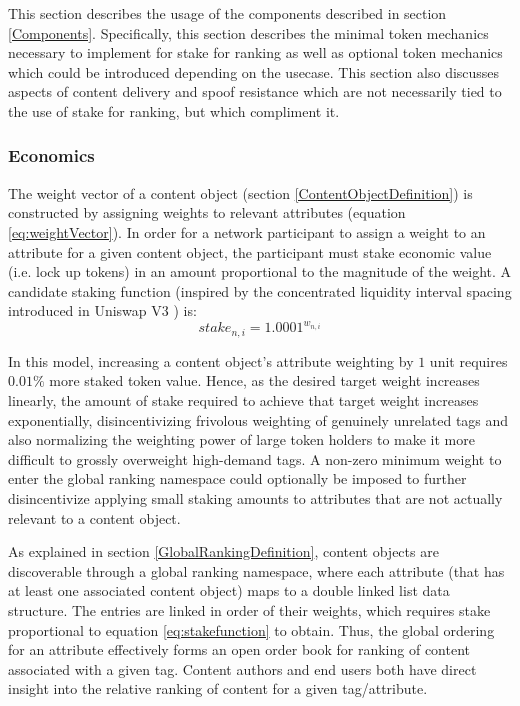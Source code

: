 This section describes the usage of the components described in section \ref{Components}. Specifically, this section describes the minimal token mechanics necessary to implement for stake for ranking as well as optional token mechanics which could be introduced depending on the usecase. This section also discusses aspects of content delivery and spoof resistance which are not necessarily tied to the use of stake for ranking, but which compliment it. 

\subsubsection{Economics}
The weight vector of a content object (section \ref{ContentObjectDefinition}) is constructed by assigning weights to relevant attributes (equation \ref{eq:weightVector}). In order for a network participant to assign a weight to an attribute for a given content object, the participant must stake economic value (i.e. lock up tokens) in an amount proportional to the magnitude of the weight. A candidate staking function (inspired by the concentrated liquidity interval spacing introduced in Uniswap V3 \cite{adams2021uniswap}) is: 
\begin{equation}
\label{eq:stakefunction}
    stake_{n,i} = 1.0001^{w_{n,i}}
\end{equation}

In this model, increasing a content object's attribute weighting by $1$ unit requires $0.01\%$ more staked token value. Hence, as the desired target weight increases linearly, the amount of stake required to achieve that target weight increases exponentially, disincentivizing frivolous weighting of genuinely unrelated tags and also normalizing the weighting power of large token holders to make it more difficult to grossly overweight high-demand tags. 
A non-zero minimum weight to enter the global ranking namespace could optionally be imposed to further disincentivize applying small staking amounts to attributes that are not actually relevant to a content object.

As explained in section \ref{GlobalRankingDefinition}, content objects are discoverable through a global ranking namespace, where each attribute (that has at least one associated content object) maps to a double linked list data structure. The entries are linked in order of their weights, which requires stake proportional to equation \ref{eq:stakefunction} to obtain. Thus, the global ordering for an attribute effectively forms an open order book for ranking of content associated with a given tag. Content authors and end users both have direct insight into the relative ranking of content for a given tag/attribute. 

